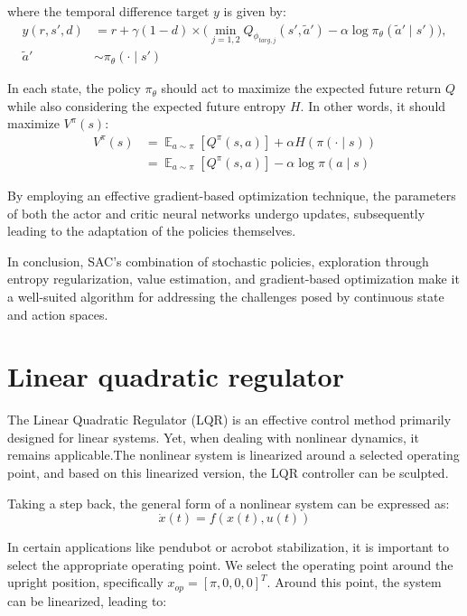 where the temporal difference target \(y\) is given by:
\begin{align}
  y(r,s',d) &= r + \gamma(1-d) \times \nonumber\bigg(\displaystyle
  \mathop{\min}_{j=1,2}Q_{\phi_{targ,j}}(s',\tilde{a}')-\alpha\log
  {\pi_\theta}(\tilde{a}'\mid{s}')\bigg), \\
  \tilde{a}'&\sim{\pi_\theta}(\cdot\mid{s'})
\end{align}

In each state, the policy \(\pi_\theta\) should act to maximize the expected
future return \(Q\) while also considering the expected future entropy \(H\). In other
words, it should maximize \(V^\pi(s)\):
\begin{align}
 V^\pi(s) &= {\displaystyle \mathop{\mathbb{E}}_{a\sim\pi}[Q^\pi(s,a)]} +
 \alpha{H(\pi(\cdot\mid{s}))} \\
 &= {\displaystyle \mathop{\mathbb{E}}_{a\sim\pi}[Q^\pi(s,a)]} -
 \alpha{\log {\pi(a\mid{s})}}
\end{align}


By employing an effective gradient-based optimization technique, the parameters
of both the actor and critic neural networks undergo updates, subsequently
leading to the adaptation of the policies themselves.

In conclusion, SAC's combination of stochastic policies, exploration through
entropy regularization, value estimation, and gradient-based optimization make
it a well-suited algorithm for addressing the challenges posed by continuous
state and action spaces.

\section{Linear quadratic regulator}
The Linear Quadratic Regulator (LQR)\cite{lehtomaki1981robustness} is an effective control method primarily designed for linear systems. Yet, when dealing with nonlinear dynamics, it remains applicable.The nonlinear system is linearized around a selected operating point, and based on this linearized version, the LQR controller can be sculpted.

Taking a step back, the general form of a nonlinear system can be expressed as:
\begin{equation}
 \dot{x}(t) = f(x(t), u(t))
\end{equation}


In certain applications like pendubot or acrobot stabilization, it is important to select the appropriate operating point. We select the operating point around the upright position, specifically \(x_{op} = [\pi,0,0,0]^T\). Around this point, the system can be linearized, leading to:

